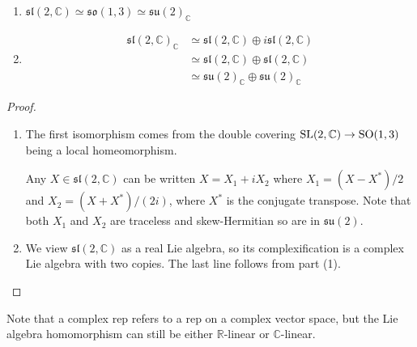 \begin{prop}
	\begin{enumerate}[(1)]
	    \item 
	$\mathfrak{sl}(2,\mathbb{C}) \simeq \mathfrak{so}(1,3)
	\simeq\mathfrak{su}(2)_{\mathbb{C}}$
		\item \phantom{}\vspace{-1.0cm}
	\begin{align*}
		\mathfrak{sl}(2,\mathbb{C})_{\mathbb{C}}
		&\simeq \mathfrak{sl}(2,\mathbb{C})\oplus i\mathfrak{sl}(2,\mathbb{C})\\
		&\simeq \mathfrak{sl}(2,\mathbb{C})\oplus \mathfrak{sl}(2,\mathbb{C}) \\
		&\simeq \mathfrak{su}(2)_{\mathbb{C}} \oplus \mathfrak{su}(2)_{\mathbb{C}}
	\end{align*}
	\end{enumerate}
\end{prop}
\begin{proof}
	\begin{enumerate}[(1)]
	    \item 
	The first isomorphism comes from the double covering $\operatorname{SL}(2,\mathbb{C}) \to
	\operatorname{SO}(1,3)$ being a local homeomorphism.

	Any $X\in \mathfrak{sl}(2,\mathbb{C})$ can be written $X = X_1 + iX_2$ where
	$X_1= (X-X^*) /2$ and $X_2= (X+X^*) /(2i)$, where $X^*$ is the conjugate
	transpose. Note that both $X_1$ and $X_2$ are traceless and skew-Hermitian
	so are in $\mathfrak{su}(2)$.
		\item 
	We view $\mathfrak{sl}(2,\mathbb{C})$ as a real Lie algebra, so its
	complexification is a complex Lie algebra with two copies. 
	The last line follows from part (1).
	\end{enumerate}
\end{proof}
 
Note that a complex rep refers to a rep on a complex
vector space, but the Lie algebra homomorphism can still be either
$\mathbb{R}$-linear or $\mathbb{C}$-linear. 

